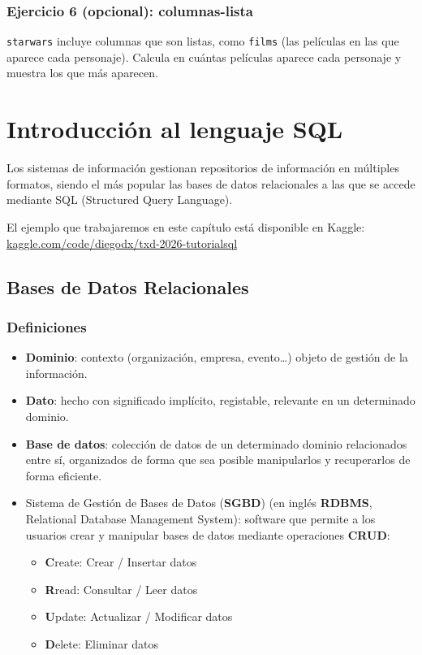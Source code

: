 \documentclass[
]{book}
\providecommand{\tightlist}{%
  \setlength{\itemsep}{0pt}\setlength{\parskip}{0pt}}
\theoremstyle{break}
\theoremstyle{nonumberplain}
\begin{document}
\subsection{Ejercicio 6 (opcional): columnas-lista}\label{ejercicio-6-opcional-columnas-lista}

\texttt{starwars} incluye columnas que son listas, como \texttt{films} (las películas en
las que aparece cada personaje). Calcula en cuántas películas aparece cada
personaje y muestra los que más aparecen.

\chapter{Introducción al lenguaje SQL}\label{introSQL}

Los sistemas de información gestionan repositorios de información en múltiples formatos,
siendo el más popular las bases de datos relacionales a las que se accede mediante SQL (Structured Query Language).

El ejemplo que trabajaremos en este capítulo está disponible en Kaggle: \href{https://www.kaggle.com/code/diegodx/txd-2026-tutorialsql}{kaggle.com/code/diegodx/txd-2026-tutorialsql}

\section{Bases de Datos Relacionales}\label{bases-de-datos-relacionales}

\subsection{Definiciones}\label{definiciones}

\begin{itemize}
\item
  \textbf{Dominio}: contexto (organización, empresa, evento\ldots) objeto de gestión de la información.
\item
  \textbf{Dato}: hecho con significado implícito, registable, relevante en un determinado dominio.
\item
  \textbf{Base de datos}: colección de datos de un determinado dominio relacionados entre sí, organizados de forma que sea posible manipularlos y recuperarlos de forma eficiente.
\item
  Sistema de Gestión de Bases de Datos (\textbf{SGBD}) (en inglés \textbf{RDBMS}, Relational Database Management System): software que permite a los usuarios crear y manipular bases de datos mediante operaciones \textbf{CRUD}:

  \begin{itemize}
  \tightlist
  \item
    \textbf{C}reate: Crear / Insertar datos
  \item
    \textbf{R}read: Consultar / Leer datos
  \item
    \textbf{U}pdate: Actualizar / Modificar datos
  \item
    \textbf{D}elete: Eliminar datos
  \end{itemize}
\end{itemize}
\end{document}
